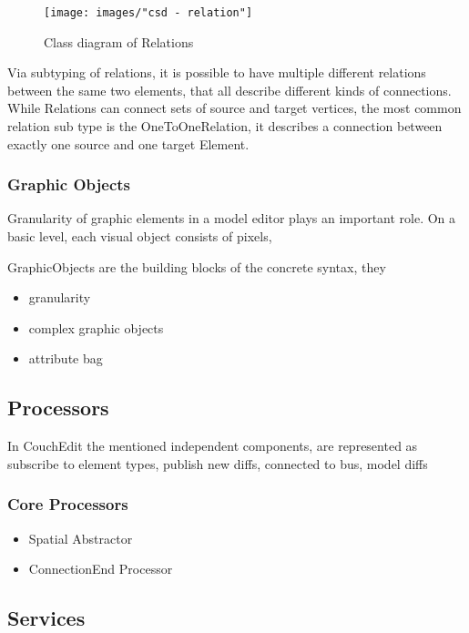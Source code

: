 \begin{figure}[ht]
  \centering
  \texttt{[image: images/"csd - relation"]}
  \caption{Class diagram of Relations}
  \label{fig:relations}
\end{figure}

Via subtyping of relations, it is possible to have multiple different relations between the same two elements, that all describe different kinds of connections. While Relations can connect sets of source and target vertices, the most common relation sub type is the OneToOneRelation, it describes a connection between exactly one source and one target Element. 


\subsubsection{Graphic Objects}
Granularity of graphic elements in a model editor plays an important role. On a basic level, each visual object consists of pixels, 


GraphicObjects are the building blocks of the concrete syntax, they 

\begin{itemize}
  \item granularity 
  \item complex graphic objects
  \item attribute bag
\end{itemize}


\subsection{Processors}
In CouchEdit the mentioned independent components, are represented as 
subscribe to element types, publish new diffs, connected to bus, model diffs

\subsubsection{Core Processors}
\begin{itemize}
  \item Spatial Abstractor 
  \item ConnectionEnd Processor
\end{itemize}

\subsection{Services}



